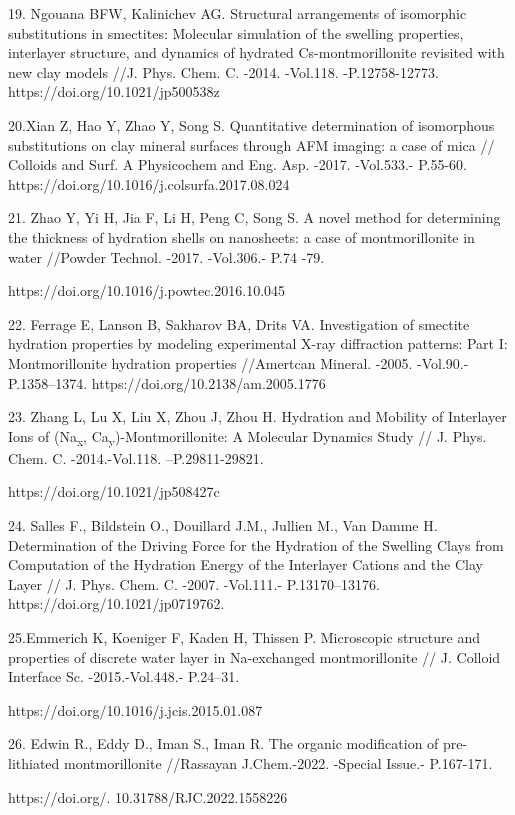 \begin{noparindent}
19. Ngouana BFW, Kalinichev AG. Structural arrangements of isomorphic
substitutions in smectites: Molecular simulation of the swelling
properties, interlayer structure, and dynamics of hydrated
Cs-montmorillonite revisited with new clay models //J. Phys. Chem. C.
-2014. -Vol.118. -P.12758-12773. https://doi.org/10.1021/jp500538z

20.Xian Z, Hao Y, Zhao Y, Song S. Quantitative determination of
isomorphous substitutions on clay mineral surfaces through AFM imaging:
a case of mica // Colloids and Surf. A Physicochem and Eng. Asp. -2017.
-Vol.533.- P.55-60. https://doi.org/10.1016/j.colsurfa.2017.08.024

21. Zhao Y, Yi H, Jia F, Li H, Peng C, Song S. A novel method for
determining the thickness of hydration shells on nanosheets: a case of
montmorillonite in water //Powder Technol. -2017. -Vol.306.- P.74 -79.

https://doi.org/10.1016/j.powtec.2016.10.045

22. Ferrage E, Lanson B, Sakharov BA, Drits VA. Investigation of
smectite hydration properties by modeling experimental X-ray diffraction
patterns: Part I: Montmorillonite hydration properties //Amertcan
Mineral. -2005. -Vol.90.- P.1358--1374.
https://doi.org/10.2138/am.2005.1776

23. Zhang L, Lu X, Liu X, Zhou J, Zhou H. Hydration and Mobility of
Interlayer Ions of (Na\textsubscript{x},
Ca\textsubscript{y})-Montmorillonite: A Molecular Dynamics Study // J.
Phys. Chem. C. -2014.-Vol.118. --P.29811-29821.

https://doi.org/10.1021/jp508427c

24. Salles F., Bildstein O., Douillard J.M., Jullien M., Van Damme H.
Determination of the Driving Force for the Hydration of the Swelling
Clays from Computation of the Hydration Energy of the Interlayer Cations
and the Clay Layer // J. Phys. Chem. C. -2007. -Vol.111.-
P.13170--13176. https://doi.org/10.1021/jp0719762.

25.Emmerich K, Koeniger F, Kaden H, Thissen P. Microscopic structure and
properties of discrete water layer in Na-exchanged montmorillonite // J.
Colloid Interface Sc. -2015.-Vol.448.- P.24--31.

https://doi.org/10.1016/j.jcis.2015.01.087

26. Edwin R., Eddy D., Iman S., Iman R. The organic modification of
pre-lithiated montmorillonite //Rassayan J.Chem.-2022. -Special Issue.-
P.167-171.

https://doi.org/. 10.31788/RJC.2022.1558226


\end{noparindent}
